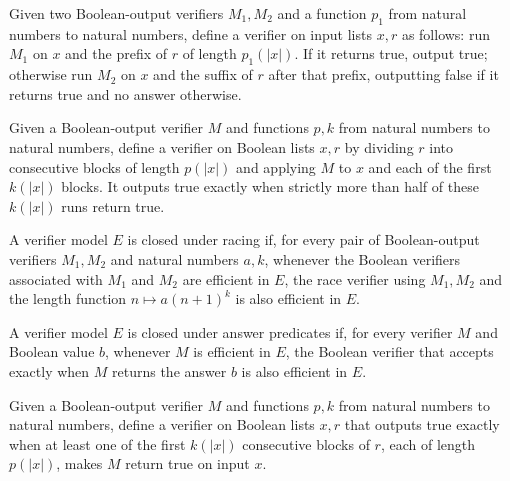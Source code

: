 \begin{definition}
\label{Randomized.raceVerifier}
\leanok
Given two Boolean-output verifiers $M_1,M_2$ and a function $p_1$ from natural numbers
to natural numbers, define a verifier on input lists $x,r$ as follows: run $M_1$ on $x$
and the prefix of $r$ of length $p_1(|x|)$. If it returns true, output true; otherwise
run $M_2$ on $x$ and the suffix of $r$ after that prefix, outputting false if it returns
true and no answer otherwise.
\end{definition}

\begin{definition}
\label{Randomized.majorityVerifier}
\leanok
Given a Boolean-output verifier $M$ and functions $p,k$ from natural numbers to natural
numbers, define a verifier on Boolean lists $x,r$ by dividing $r$ into consecutive
blocks of length $p(|x|)$ and applying $M$ to $x$ and each of the first $k(|x|)$ blocks.
It outputs true exactly when strictly more than half of these $k(|x|)$ runs return true.
\end{definition}

\begin{definition}
\label{Randomized.ClosedUnderRace}
\leanok
{}
A verifier model $E$ is closed under racing if, for every pair of Boolean-output
verifiers $M_1,M_2$ and natural numbers $a,k$, whenever the Boolean verifiers associated
with $M_1$ and $M_2$ are efficient in $E$, the race verifier using $M_1,M_2$ and the
length function $n\mapsto a(n+1)^k$ is also efficient in $E$.
\end{definition}

\begin{definition}
\label{Randomized.ClosedUnderAnswerIs}
\leanok
{}
A verifier model $E$ is closed under answer predicates if, for every verifier $M$ and
Boolean value $b$, whenever $M$ is efficient in $E$, the Boolean verifier that accepts
exactly when $M$ returns the answer $b$ is also efficient in $E$.
\end{definition}

\begin{definition}
\label{Randomized.anyVerifier}
\leanok
Given a Boolean-output verifier $M$ and functions $p,k$ from natural numbers to natural
numbers, define a verifier on Boolean lists $x,r$ that outputs true exactly when at
least one of the first $k(|x|)$ consecutive blocks of $r$, each of length $p(|x|)$,
makes $M$ return true on input $x$.
\end{definition}

